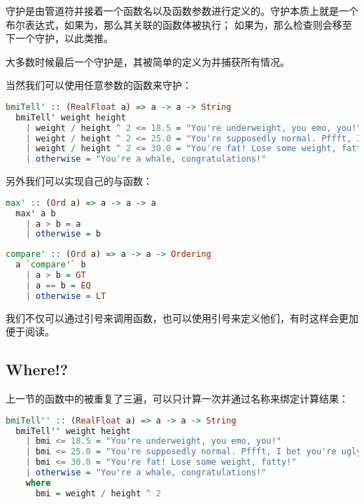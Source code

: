 \documentclass[./main.tex]{subfiles}
\begin{document}
守护是由管道符并接着一个函数名以及函数参数进行定义的。守护本质上就是一个布尔表达式，如果为，那么其关联的函数体被执行；
如果为，那么检查则会移至下一个守护，以此类推。

大多数时候最后一个守护是，其被简单的定义为并捕获所有情况。

当然我们可以使用任意参数的函数来守护：

\begin{lstlisting}[language=Haskell]
  bmiTell' :: (RealFloat a) => a -> a -> String
  bmiTell' weight height
    | weight / height ^ 2 <= 18.5 = "You're underweight, you emo, you!"
    | weight / height ^ 2 <= 25.0 = "You're supposedly normal. Pffft, I bet you're ugly!"
    | weight / height ^ 2 <= 30.0 = "You're fat! Lose some weight, fatty!"
    | otherwise = "You're a whale, congratulations!"
\end{lstlisting}

另外我们可以实现自己的与函数：

\begin{lstlisting}[language=Haskell]
  max' :: (Ord a) => a -> a -> a
  max' a b
    | a > b = a
    | otherwise = b
\end{lstlisting}

\begin{lstlisting}[language=Haskell]
  compare' :: (Ord a) => a -> a -> Ordering
  a `compare'` b
    | a > b = GT
    | a == b = EQ
    | otherwise = LT
\end{lstlisting}

\begin{anote}
  我们不仅可以通过引号来调用函数，也可以使用引号来定义他们，有时这样会更加便于阅读。
\end{anote}

\subsection*{Where!?}

上一节的函数中的被重复了三遍，可以只计算一次并通过名称来绑定计算结果：

\begin{lstlisting}[language=Haskell]
  bmiTell'' :: (RealFloat a) => a -> a -> String
  bmiTell'' weight height
    | bmi <= 18.5 = "You're underweight, you emo, you!"
    | bmi <= 25.0 = "You're supposedly normal. Pffft, I bet you're ugly!"
    | bmi <= 30.0 = "You're fat! Lose some weight, fatty!"
    | otherwise = "You're a whale, congratulations!"
    where
      bmi = weight / height ^ 2
\end{lstlisting}
\end{document}
